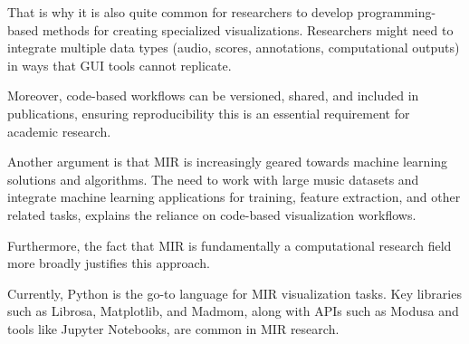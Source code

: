 That is why it is also quite common for researchers to develop programming-based methods for creating specialized visualizations. Researchers might need to integrate multiple data types (audio, scores, annotations, computational outputs) in ways that GUI tools cannot replicate.

Moreover, code-based workflows can be versioned, shared, and included in publications, ensuring reproducibility this is an essential requirement for academic research.

Another argument is that MIR is increasingly geared towards machine learning solutions and algorithms. The need to work with large music datasets and integrate machine learning applications for training, feature extraction, and other related tasks, explains the reliance on code-based visualization workflows.

Furthermore, the fact that MIR is fundamentally a computational research field more broadly justifies this approach.

Currently, Python is the go-to language for MIR visualization tasks. Key libraries such as Librosa, Matplotlib, and Madmom, along with APIs such as Modusa and tools like Jupyter Notebooks, are common in MIR research.



